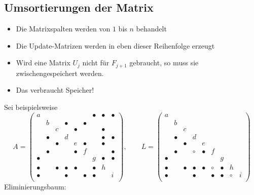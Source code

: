 \subsection{Umsortierungen der Matrix}
\begin{itemize}
	\item Die Matrixspalten werden von $1$ bis $n$ behandelt
	\item Die Update-Matrizen werden in eben dieser Reihenfolge erzeugt
	\item Wird eine Matrix $U_j$ nicht für $F_{j+1}$ gebraucht, so muss sie zwischengespeichert werden.
	\item Das verbraucht Speicher!
\end{itemize}
Sei beispielsweise \begin{equation*}
	A=\begin{pmatrix}
		a & & & & & & \bullet & \bullet & \bullet \\
		& b & & \bullet & & \bullet & & & \\
		& & c & & \bullet & & & \bullet & \\
		& \bullet & & d & & & & \bullet & \bullet \\
		& & \bullet & & e & \bullet & & \bullet & \\
		& \bullet & & & \bullet & f & & & \bullet \\
		\bullet & & & & & & g & \bullet & \bullet \\
		\bullet & & \bullet & \bullet & \bullet & & \bullet & h & \\
		\bullet & & & \bullet & & \bullet & \bullet & & i \\
	\end{pmatrix},
 \qquad
 L=\begin{pmatrix}
		a & & & & & & & & \\
		& b & & & & & & & \\
		& & c & & & & & & \\
		& \bullet & & d & & & & & \\
		& & \bullet & & e & & & & \\
		& \bullet & & \circ & \bullet & f & & & \\
		\bullet & & & & & & g & & \\
		\bullet & & \bullet & \bullet & \bullet & \circ & \bullet & h & \\
		\bullet & & & \bullet & & \bullet & \bullet & \circ & i \\
	\end{pmatrix}
\end{equation*}
Eliminierungsbaum:
